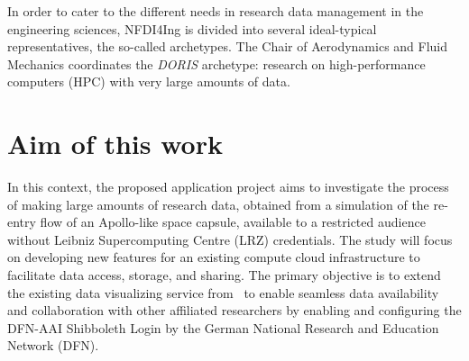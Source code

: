 In order to cater to the different needs in research data management in the
engineering sciences, NFDI4Ing is divided into several ideal-typical
representatives, the so-called archetypes. The Chair of Aerodynamics and Fluid
Mechanics coordinates the \textit{DORIS} archetype: research on high-performance
computers (HPC) with very large amounts of data. 

\section{Aim of this work}
In this context, the proposed application project aims to investigate the
process of making large amounts of research data, obtained from a simulation of
the re-entry flow of an Apollo-like space capsule, available to a restricted
audience without Leibniz Supercomputing Centre (LRZ) credentials. The study will
focus on developing new features for an existing compute cloud infrastructure to
facilitate data access, storage, and sharing. The primary objective is to extend
the existing data visualizing service from~\cite{nowak2024pvw} to enable
seamless data availability and collaboration with other affiliated researchers
by enabling and configuring the DFN-AAI Shibboleth Login by the German National
Research and Education Network (DFN). 

